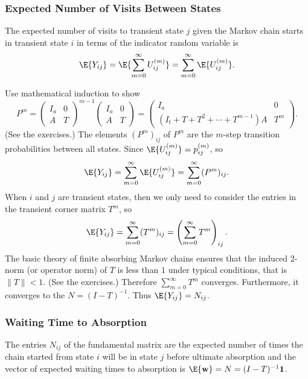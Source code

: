 \documentclass[12pt]{article}
\begin{document}
\subsubsection*{Expected Number of Visits Between States}

The expected number of visits to transient state \( j \) given the
Markov chain starts in transient state \( i \) in terms of the indicator
random variable is
\[
    \E{Y_{ij}} = \E{\sum\limits_{m=0}^{\infty} U_{ij}^{(m)} } = \sum\limits_
    {m=0}^{\infty} \E{U_{ij}^{(m)}}.
\]

Use mathematical induction to show
\[
    P^{m} =
    \begin{pmatrix}
        I_a & 0 \\
        A & T
    \end{pmatrix}
    ^{m-1}
    \begin{pmatrix}
        I_a & 0 \\
        A & T
    \end{pmatrix}
    =
    \begin{pmatrix}
        I_a & 0 \\
        (I_t + T + T^2 + \cdots + T^{m-1})A & T^m
    \end{pmatrix}
    .
\] (See the exercises.) The elements \( (P^{m})_{ij} \) of \( P^m \) are
the \( m \)-step transition probabilities between all states.  Since \(
\E{U_{ij}^{(m)}} = p_{ij}^{%
(m)} \), so
\[
    \E{Y_{ij}} = \sum\limits_{m=0}^{\infty} \E{U_{ij}^{(m)}} = \sum\limits_
    {m=0}^{\infty} (P^{m})_{ij}.
\] When \( i \) and \( j \) are transient states, then we only need to
consider the entries in the transient corner matrix \( T^m \), so
\[
    \E{Y_{ij}} = \sum\limits_{m=0}^{\infty} (T^m)_{ij} = \left( \sum\limits_
    {m=0}^{\infty} T^m \right)_{ij}.
\] The basic theory of finite absorbing Markov chains ensures that the
induced \( 2 \)-norm (or operator norm) of \( T \) is less than \( 1 \)
under typical conditions, that is \( \| T \| < 1 \).  (See the
exercises.) Therefore \( \sum_{m=0}^{\infty} T^m \) converges.
Furthermore, it converges to the  \( N = (I-T)^
{-1} \).%
Thus \( \E{Y_{ij}} = N_{ij} \).

\subsubsection*{Waiting Time to Absorption}

\begin{theorem}
    The entries \( N_{ij} \) of the fundamental matrix are the expected
    number of times the chain started from state \( i \) will be in
    state \( j \) before ultimate absorption and the vector of expected
    waiting times to absorption is \( \E{\mathbf{w}} = N = (I-T)^{-1}
    \mathbf{1} \).
\end{theorem}
\end{document}
